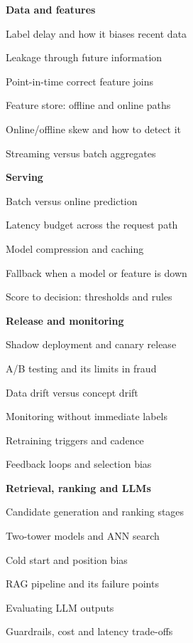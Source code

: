 \documentclass[10pt,a4paper]{article}
\begin{document}
\begin{minipage}[t]{0.48\textwidth}
\textbf{Data and features}
\begin{checklist}
  \item Label delay and how it biases recent data
  \item Leakage through future information
  \item Point-in-time correct feature joins
  \item Feature store: offline and online paths
  \item Online/offline skew and how to detect it
  \item Streaming versus batch aggregates
\end{checklist}
\textbf{Serving}
\begin{checklist}
  \item Batch versus online prediction
  \item Latency budget across the request path
  \item Model compression and caching
  \item Fallback when a model or feature is down
  \item Score to decision: thresholds and rules
\end{checklist}
\end{minipage}\hfill
\begin{minipage}[t]{0.48\textwidth}
\textbf{Release and monitoring}
\begin{checklist}
  \item Shadow deployment and canary release
  \item A/B testing and its limits in fraud
  \item Data drift versus concept drift
  \item Monitoring without immediate labels
  \item Retraining triggers and cadence
  \item Feedback loops and selection bias
\end{checklist}
\textbf{Retrieval, ranking and LLMs}
\begin{checklist}
  \item Candidate generation and ranking stages
  \item Two-tower models and ANN search
  \item Cold start and position bias
  \item RAG pipeline and its failure points
  \item Evaluating LLM outputs
  \item Guardrails, cost and latency trade-offs
\end{checklist}
\end{minipage}
\end{document}
